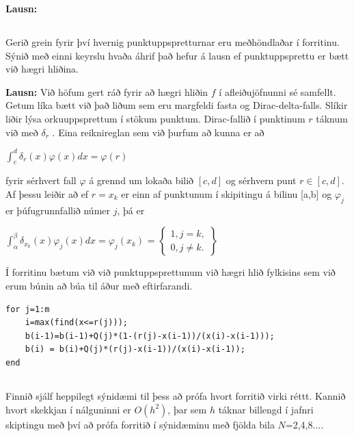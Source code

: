 \documentclass[11pt,a4paper,titlepage]{article}
\begin{document}
\textbf{Lausn:} 

\subsection{}
Gerið grein fyrir því hvernig punktuppspretturnar eru meðhöndlaðar í forritinu. Sýnið með einni keyrslu hvaða áhrif það hefur á lausn ef punktuppsprettu er bætt við hægri hliðina. 

\textbf{Lausn:} 
Við höfum gert ráð fyrir að hægri hliðin $f$ í afleiðujöfnunni sé samfellt. Getum líka bætt við það liðum sem eru margfeldi fasta og Dirac-delta-falls. Slíkir liðir lýsa orkuuppsprettum í stökum punktum.  Dirac-fallið í punktinum $r$ táknum við með $\delta _{r}$ . Eina reiknireglan sem við þurfum að kunna er að 

$\int_{c}^{d}\delta _{r}(x) \varphi (x)dx=\varphi(r)$

fyrir sérhvert fall $\varphi$ á grennd um lokaða bilið $[c,d]$ og sérhvern punt $r\in[c,d]$. Af þessu leiðir að ef $r=x_{k}$ er einn af punktunum í skipitingu á bilinu [a,b] og $\varphi_{j}$ er þúfugrunnfallið númer $j$, þá er 

$\int_{\alpha}^{\beta}\delta_{x_{k}}(x)\varphi_{j}(x)dx = \varphi_{j}(x_{k})$
=
$\begin{Bmatrix}
1, j=k,
\\ 
0, j \neq k .
\end{Bmatrix}$

Í forritinu bætum við við punktuppsprettunum við hægri hlið fylkisins sem við erum búnin að búa til áður með eftirfarandi. 
\begin{verbatim}
for j=1:m
    i=max(find(x<=r(j)));
    b(i-1)=b(i-1)+Q(j)*(1-(r(j)-x(i-1))/(x(i)-x(i-1)));
    b(i) = b(i)+Q(j)*(r(j)-x(i-1))/(x(i)-x(i-1));
end
\end{verbatim}
 


\subsection{}
Finnið sjálf heppilegt sýnidæmi til þess að prófa hvort forritið virki réttt. Kannið hvort skekkjan í nálguninni er $O(h^2)$, þar sem $h$ táknar billengd í jafnri skiptingu með því að prófa forritið í sýnidæminu með fjölda bila $N$=2,4,8....
\end{document}
